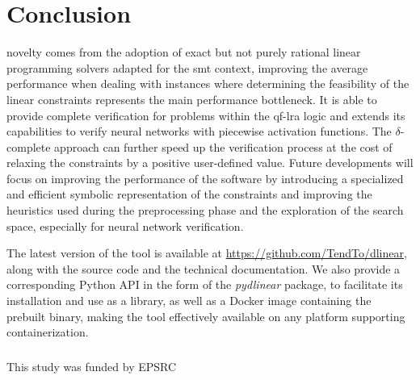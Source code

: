 \documentclass[runningheads]{llncs}
\begin{document}
\section{Conclusion}

\dlinear novelty comes from the adoption of exact but not purely rational linear programming solvers adapted for the \gls{smt} context, improving the average performance when dealing with instances where determining the feasibility of the linear constraints represents the main performance bottleneck.
It is able to provide complete verification for problems within the \gls{qf-lra} logic and extends its capabilities to verify neural networks with piecewise activation functions.
The $\delta$-complete approach can further speed up the verification process at the cost of relaxing the constraints by a positive user-defined value.
Future developments will focus on improving the performance of the software by introducing a specialized and efficient symbolic representation of the constraints and improving the heuristics used during the preprocessing phase and the exploration of the search space, especially for neural network verification.

The latest version of the tool is available at \url{https://github.com/TendTo/dlinear}, along with the source code and the technical documentation.
We also provide a corresponding Python API in the form of the \textit{pydlinear} package, to facilitate its installation and use as a library, as well as a Docker image containing the prebuilt binary, making the tool effectively available on any platform supporting containerization.

\begin{credits}
    \subsubsection{\ackname} This study was funded by EPSRC
\end{credits}



\end{document}
